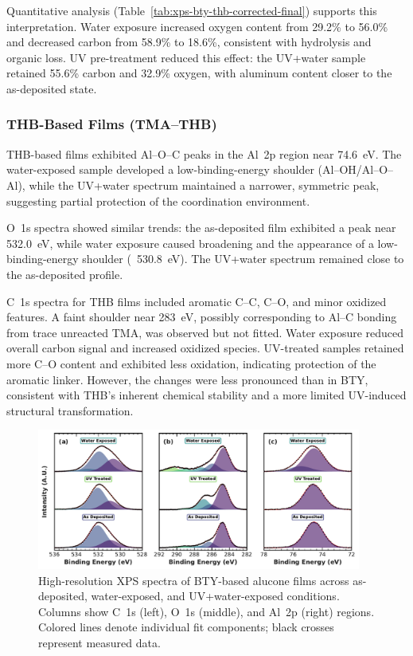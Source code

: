 Quantitative analysis (Table~\ref{tab:xps-bty-thb-corrected-final}) supports this interpretation. Water exposure increased oxygen content from 29.2\% to 56.0\% and decreased carbon from 58.9\% to 18.6\%, consistent with hydrolysis and organic loss. UV pre-treatment reduced this effect: the UV+water sample retained 55.6\% carbon and 32.9\% oxygen, with aluminum content closer to the as-deposited state.

\subsubsection*{THB-Based Films (TMA–THB)}

THB-based films exhibited Al–O–C peaks in the Al~2p region near 74.6~eV. The water-exposed sample developed a low-binding-energy shoulder (Al–OH/Al–O–Al), while the UV+water spectrum maintained a narrower, symmetric peak, suggesting partial protection of the coordination environment.

O~1s spectra showed similar trends: the as-deposited film exhibited a peak near 532.0~eV, while water exposure caused broadening and the appearance of a low-binding-energy shoulder (~530.8~eV). The UV+water spectrum remained close to the as-deposited profile.

C~1s spectra for THB films included aromatic C–C, C–O, and minor oxidized features. A faint shoulder near 283~eV, possibly corresponding to Al–C bonding from trace unreacted TMA, was observed but not fitted. Water exposure reduced overall carbon signal and increased oxidized species. UV-treated samples retained more C–O content and exhibited less oxidation, indicating protection of the aromatic linker. However, the changes were less pronounced than in BTY, consistent with THB’s inherent chemical stability and a more limited UV-induced structural transformation.

\begin{figure}[H]
  \centering
  \includegraphics[width=0.95\textwidth]{Figures/XPS_publication_figure_final.pdf}
  \caption{High-resolution XPS spectra of BTY-based alucone films across as-deposited, water-exposed, and UV+water-exposed conditions. Columns show C~1s (left), O~1s (middle), and Al~2p (right) regions. Colored lines denote individual fit components; black crosses represent measured data.}
  \label{fig:xps_bty}
\end{figure}

